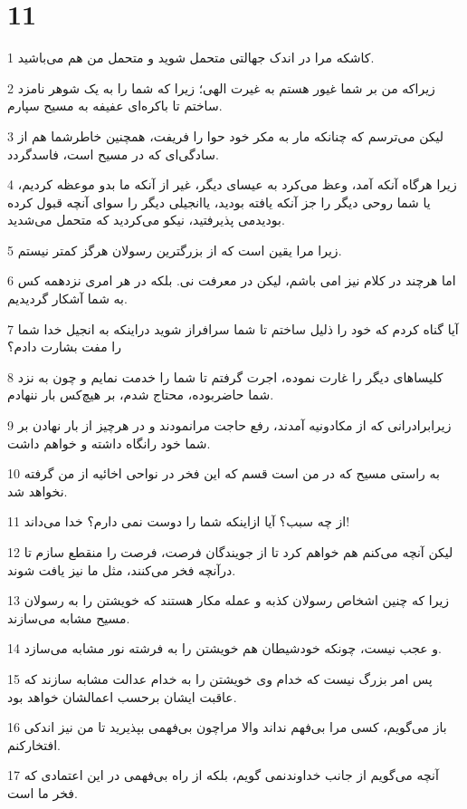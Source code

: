 \chapter{11}

\par 1 کاشکه مرا در اندک جهالتی متحمل شوید و متحمل من هم می‌باشید.
\par 2 زیراکه من بر شما غیور هستم به غیرت الهی؛ زیرا که شما را به یک شوهر نامزد ساختم تا باکره‌ای عفیفه به مسیح سپارم.
\par 3 لیکن می‌ترسم که چنانکه مار به مکر خود حوا را فریفت، همچنین خاطرشما هم از سادگی‌ای که در مسیح است، فاسدگردد.
\par 4 زیرا هرگاه آنکه آمد، وعظ می‌کرد به عیسای دیگر، غیر از آنکه ما بدو موعظه کردیم، یا شما روحی دیگر را جز آنکه یافته بودید، یاانجیلی دیگر را سوای آنچه قبول کرده بودیدمی پذیرفتید، نیکو می‌کردید که متحمل می‌شدید.
\par 5 زیرا مرا یقین است که از بزرگترین رسولان هرگز کمتر نیستم.
\par 6 اما هرچند در کلام نیز امی باشم، لیکن در معرفت نی. بلکه در هر امری نزدهمه کس به شما آشکار گردیدیم.
\par 7 آیا گناه کردم که خود را ذلیل ساختم تا شما سرافراز شوید دراینکه به انجیل خدا شما را مفت بشارت دادم؟
\par 8 کلیساهای دیگر را غارت نموده، اجرت گرفتم تا شما را خدمت نمایم و چون به نزد شما حاضربوده، محتاج شدم، بر هیچ‌کس بار ننهادم.
\par 9 زیرابرادرانی که از مکادونیه آمدند، رفع حاجت مرانمودند و در هرچیز از بار نهادن بر شما خود رانگاه داشته و خواهم داشت.
\par 10 به راستی مسیح که در من است قسم که این فخر در نواحی اخائیه از من گرفته نخواهد شد.
\par 11 از چه سبب؟ آیا ازاینکه شما را دوست نمی دارم؟ خدا می‌داند!
\par 12 لیکن آنچه می‌کنم هم خواهم کرد تا از جویندگان فرصت، فرصت را منقطع سازم تا درآنچه فخر می‌کنند، مثل ما نیز یافت شوند.
\par 13 زیرا که چنین اشخاص رسولان کذبه و عمله مکار هستند که خویشتن را به رسولان مسیح مشابه می‌سازند.
\par 14 و عجب نیست، چونکه خودشیطان هم خویشتن را به فرشته نور مشابه می‌سازد.
\par 15 پس امر بزرگ نیست که خدام وی خویشتن را به خدام عدالت مشابه سازند که عاقبت ایشان برحسب اعمالشان خواهد بود.
\par 16 باز می‌گویم، کسی مرا بی‌فهم نداند والا مراچون بی‌فهمی بپذیرید تا من نیز اندکی افتخارکنم.
\par 17 آنچه می‌گویم از جانب خداوندنمی گویم، بلکه از راه بی‌فهمی در این اعتمادی که فخر ما است.
